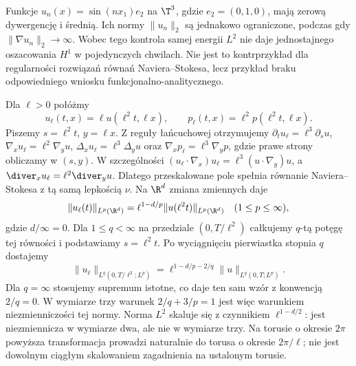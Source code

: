 \begin{kontrprzyklad}
Funkcje $u_n(x)=\sin(nx_1)e_2$ na $\T^3$, gdzie
$e_2=(0,1,0)$, mają zerową dywergencję i średnią.
Ich normy $\|u_n\|_2$ są jednakowo ograniczone,
podczas gdy $\|\nabla u_n\|_2\to\infty$.
Wobec tego kontrola samej energii $L^2$ nie daje
jednostajnego oszacowania $H^1$ w pojedynczych chwilach.
Nie jest to kontrprzykład dla regularności rozwiązań
równań Naviera--Stokesa, lecz przykład braku
odpowiedniego wniosku funkcjonalno-analitycznego.
\end{kontrprzyklad}

\begin{uwaga}
Dla $\ell>0$ połóżmy
\[
 u_\ell(t,x)=\ell u(\ell^2t,\ell x),\qquad
 p_\ell(t,x)=\ell^2p(\ell^2t,\ell x).
\]
Piszemy $s=\ell^2t$, $y=\ell x$. Z reguły
łańcuchowej otrzymujemy
$\partial_t u_\ell=\ell^3\partial_s u$,
$\nabla_xu_\ell=\ell^2\nabla_yu$,
$\Delta_xu_\ell=\ell^3\Delta_yu$ oraz
$\nabla_xp_\ell=\ell^3\nabla_yp$,
gdzie prawe strony obliczamy w $(s,y)$.
W szczególności $(u_\ell\cdot\nabla_x)u_\ell
=\ell^3(u\cdot\nabla_y)u$,
a $\diver_x u_\ell=\ell^2\diver_y u$.
Dlatego przeskalowane pole spełnia równanie
Naviera--Stokesa z tą samą lepkością $\nu$.
Na $\R^d$ zmiana zmiennych daje
\[
 \|u_\ell(t)\|_{L^p(\R^d)}
 =\ell^{1-d/p}\|u(\ell^2t)\|_{L^p(\R^d)}
 \quad(1\le p\le\infty),
\]
gdzie $d/\infty=0$. Dla $1\le q<\infty$ na przedziale
$(0,T/\ell^2)$ całkujemy $q$-tą potęgę
tej równości i podstawiamy $s=\ell^2t$.
Po wyciągnięciu pierwiastka stopnia $q$ dostajemy
\[
 \|u_\ell\|_{L^q(0,T/\ell^2;L^p)}
 =\ell^{1-d/p-2/q}\|u\|_{L^q(0,T;L^p)}.
\]
Dla $q=\infty$ stosujemy supremum istotne,
co daje ten sam wzór z konwencją $2/q=0$.
W wymiarze trzy warunek $2/q+3/p=1$
jest więc warunkiem niezmienniczości tej normy.
Norma $L^2$ skaluje się z czynnikiem
$\ell^{1-d/2}$: jest niezmiennicza w wymiarze dwa,
ale nie w wymiarze trzy.
Na torusie o okresie $2\pi$ powyższa transformacja
prowadzi naturalnie do torusa o okresie $2\pi/\ell$;
nie jest dowolnym ciągłym skalowaniem
zagadnienia na ustalonym torusie.
\end{uwaga}

